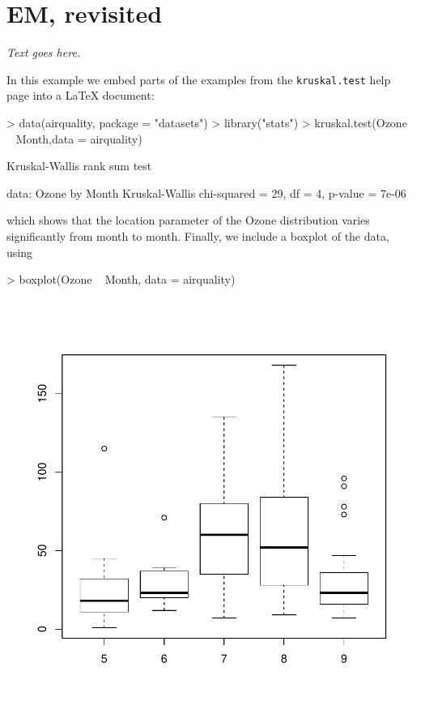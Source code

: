 \documentclass[final]{siamart171218}
\begin{document}
\section{EM, revisited}
{\em Text goes here.}

In this example we embed parts of the examples from the
\texttt{kruskal.test} help page into a \LaTeX{} document:
\begin{Schunk}
\begin{Sinput}
> data(airquality, package = "datasets")
> library("stats")
> kruskal.test(Ozone ~ Month,data = airquality)
\end{Sinput}
\begin{Soutput}
	Kruskal-Wallis rank sum test

data:  Ozone by Month
Kruskal-Wallis chi-squared = 29, df = 4, p-value = 7e-06
\end{Soutput}
\end{Schunk}

which shows that the location parameter of the Ozone distribution
varies significantly from month to month. Finally, we include a
boxplot of the data, using
\begin{Schunk}
\begin{Sinput}
> boxplot(Ozone ~ Month, data = airquality)
\end{Sinput}
\end{Schunk}
\begin{center} 
\includegraphics{algorithms-004}
\end{center}
\end{document}
